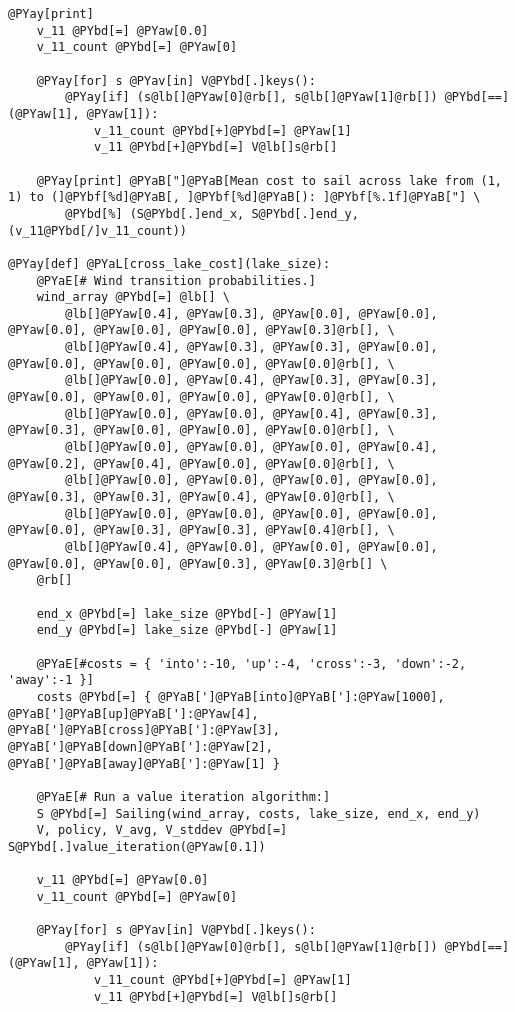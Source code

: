 \begin{Verbatim}[commandchars=@\[\]]
    @PYay[print]
    v_11 @PYbd[=] @PYaw[0.0]
    v_11_count @PYbd[=] @PYaw[0]

    @PYay[for] s @PYav[in] V@PYbd[.]keys():
        @PYay[if] (s@lb[]@PYaw[0]@rb[], s@lb[]@PYaw[1]@rb[]) @PYbd[==] (@PYaw[1], @PYaw[1]):
            v_11_count @PYbd[+]@PYbd[=] @PYaw[1]
            v_11 @PYbd[+]@PYbd[=] V@lb[]s@rb[]

    @PYay[print] @PYaB["]@PYaB[Mean cost to sail across lake from (1, 1) to (]@PYbf[%d]@PYaB[, ]@PYbf[%d]@PYaB[): ]@PYbf[%.1f]@PYaB["] \
        @PYbd[%] (S@PYbd[.]end_x, S@PYbd[.]end_y, (v_11@PYbd[/]v_11_count))

@PYay[def] @PYaL[cross_lake_cost](lake_size):
    @PYaE[# Wind transition probabilities.]
    wind_array @PYbd[=] @lb[] \
        @lb[]@PYaw[0.4], @PYaw[0.3], @PYaw[0.0], @PYaw[0.0], @PYaw[0.0], @PYaw[0.0], @PYaw[0.0], @PYaw[0.3]@rb[], \
        @lb[]@PYaw[0.4], @PYaw[0.3], @PYaw[0.3], @PYaw[0.0], @PYaw[0.0], @PYaw[0.0], @PYaw[0.0], @PYaw[0.0]@rb[], \
        @lb[]@PYaw[0.0], @PYaw[0.4], @PYaw[0.3], @PYaw[0.3], @PYaw[0.0], @PYaw[0.0], @PYaw[0.0], @PYaw[0.0]@rb[], \
        @lb[]@PYaw[0.0], @PYaw[0.0], @PYaw[0.4], @PYaw[0.3], @PYaw[0.3], @PYaw[0.0], @PYaw[0.0], @PYaw[0.0]@rb[], \
        @lb[]@PYaw[0.0], @PYaw[0.0], @PYaw[0.0], @PYaw[0.4], @PYaw[0.2], @PYaw[0.4], @PYaw[0.0], @PYaw[0.0]@rb[], \
        @lb[]@PYaw[0.0], @PYaw[0.0], @PYaw[0.0], @PYaw[0.0], @PYaw[0.3], @PYaw[0.3], @PYaw[0.4], @PYaw[0.0]@rb[], \
        @lb[]@PYaw[0.0], @PYaw[0.0], @PYaw[0.0], @PYaw[0.0], @PYaw[0.0], @PYaw[0.3], @PYaw[0.3], @PYaw[0.4]@rb[], \
        @lb[]@PYaw[0.4], @PYaw[0.0], @PYaw[0.0], @PYaw[0.0], @PYaw[0.0], @PYaw[0.0], @PYaw[0.3], @PYaw[0.3]@rb[] \
    @rb[]

    end_x @PYbd[=] lake_size @PYbd[-] @PYaw[1]
    end_y @PYbd[=] lake_size @PYbd[-] @PYaw[1]

    @PYaE[#costs = { 'into':-10, 'up':-4, 'cross':-3, 'down':-2, 'away':-1 }]
    costs @PYbd[=] { @PYaB[']@PYaB[into]@PYaB[']:@PYaw[1000], @PYaB[']@PYaB[up]@PYaB[']:@PYaw[4], @PYaB[']@PYaB[cross]@PYaB[']:@PYaw[3], @PYaB[']@PYaB[down]@PYaB[']:@PYaw[2], @PYaB[']@PYaB[away]@PYaB[']:@PYaw[1] }

    @PYaE[# Run a value iteration algorithm:]
    S @PYbd[=] Sailing(wind_array, costs, lake_size, end_x, end_y)
    V, policy, V_avg, V_stddev @PYbd[=] S@PYbd[.]value_iteration(@PYaw[0.1])

    v_11 @PYbd[=] @PYaw[0.0]
    v_11_count @PYbd[=] @PYaw[0]

    @PYay[for] s @PYav[in] V@PYbd[.]keys():
        @PYay[if] (s@lb[]@PYaw[0]@rb[], s@lb[]@PYaw[1]@rb[]) @PYbd[==] (@PYaw[1], @PYaw[1]):
            v_11_count @PYbd[+]@PYbd[=] @PYaw[1]
            v_11 @PYbd[+]@PYbd[=] V@lb[]s@rb[]


\end{Verbatim}
